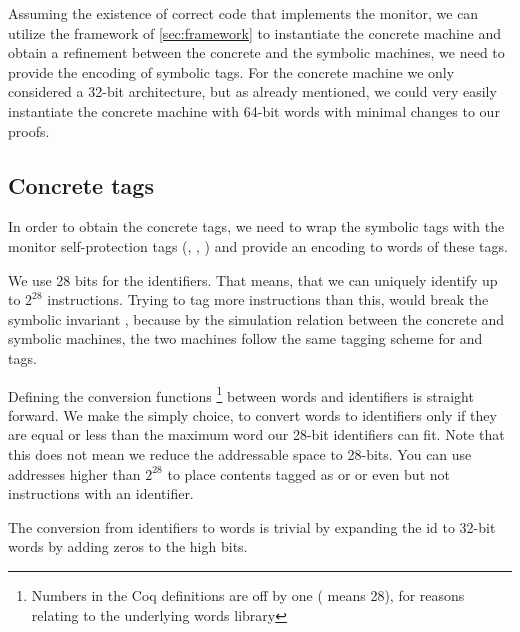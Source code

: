 Assuming the existence of correct code that implements the \CFI
monitor, we can utilize the framework of \cref{sec:framework} to
instantiate the concrete machine and obtain a refinement between the
concrete and the symbolic machines, we need to provide the encoding of
symbolic tags. For the concrete machine we only considered a 32-bit
architecture, but as already mentioned, we could very easily
instantiate the concrete machine with 64-bit words with minimal
changes to our proofs.

\subsection{Concrete tags}\label{sec:concrete_tags}

In order to obtain the concrete tags, we need to wrap the symbolic
tags with the monitor self-protection tags (\USERname, \ENTRYname,
\MONITOR) and provide an encoding to words of these tags.

We use 28 bits for the identifiers. That means, that we can uniquely
identify up to $2^{28}$ instructions. Trying to tag more instructions
than this, would break the symbolic
invariant , because by the simulation
relation between the concrete and symbolic machines, the two machines
follow the same tagging scheme for \USERname and \ENTRYname tags.

Defining the conversion functions \footnote{Numbers in the Coq
  definitions are off by one ( means 28), for reasons relating
  to the underlying words library } between
words and identifiers is straight forward. We make the
simply choice, to convert words to identifiers only if they
are equal or less than the maximum word our 28-bit identifiers can
fit. Note that this does not mean we reduce the addressable space to
28-bits. You can use addresses higher than $2^{28}$ to place contents
tagged as \DATAname or \MONITOR or even \INSTR{$\bot$} but not
instructions with an identifier.

The conversion from identifiers to words is trivial by
expanding the id to 32-bit words by adding zeros to the high bits.




